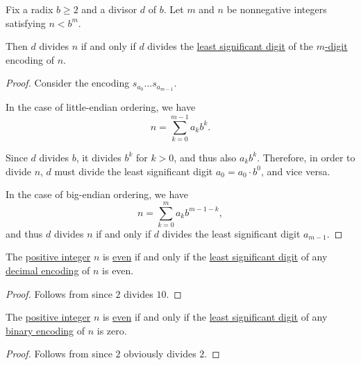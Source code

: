 \begin{proposition}\label{thm:nonnegative_integer_expansion_divisibility}
  Fix a radix \( b \geq 2 \) and a divisor \( d \) of \( b \). Let \( m \) and \( n \) be nonnegative integers satisfying \( n < b^m \).

  Then \( d \) divides \( n \) if and only if \( d \) divides the \hyperref[def:endianness]{least significant digit} of the \hyperref[def:fixed_length_nonnegative_integer_encoding]{\( m \)-digit} encoding of \( n \).
\end{proposition}
\begin{proof}
  Consider the encoding \( s_{a_0} \ldots s_{a_{m-1}} \).

  In the case of little-endian ordering, we have
  \begin{equation*}
    n = \sum_{k=0}^{m-1} a_k b^k.
  \end{equation*}

  Since \( d \) divides \( b \), it divides \( b^k \) for \( k > 0 \), and thus also \( a_k b^k \). Therefore, in order to divide \( n \), \( d \) must divide the least significant digit \( a_0 = a_0 \cdot b^0 \), and vice versa.

  In the case of big-endian ordering, we have
  \begin{equation*}
    n = \sum_{k=0}^m a_k b^{m-1-k},
  \end{equation*}
  and thus \( d \) divides \( n \) if and only if \( d \) divides the least significant digit \( a_{m-1} \).
\end{proof}

\begin{corollary}\label{thm:nonnegative_integer_decimal_expansion_parity}
  The \hyperref[def:integers]{positive integer} \( n \) is \hyperref[def:integer_parity]{even} if and only if the \hyperref[def:endianness]{least significant digit} of any \hyperref[def:fixed_length_nonnegative_integer_encoding]{decimal encoding} of \( n \) is even.
\end{corollary}
\begin{proof}
  Follows from  since \( 2 \) divides \( 10 \).
\end{proof}

\begin{corollary}\label{thm:nonnegative_integer_binary_expansion_parity}
  The \hyperref[def:integers]{positive integer} \( n \) is \hyperref[def:integer_parity]{even} if and only if the \hyperref[def:endianness]{least significant digit} of any \hyperref[def:fixed_length_nonnegative_integer_encoding]{binary encoding} of \( n \) is zero.
\end{corollary}
\begin{proof}
  Follows from  since \( 2 \) obviously divides \( 2 \).
\end{proof}

